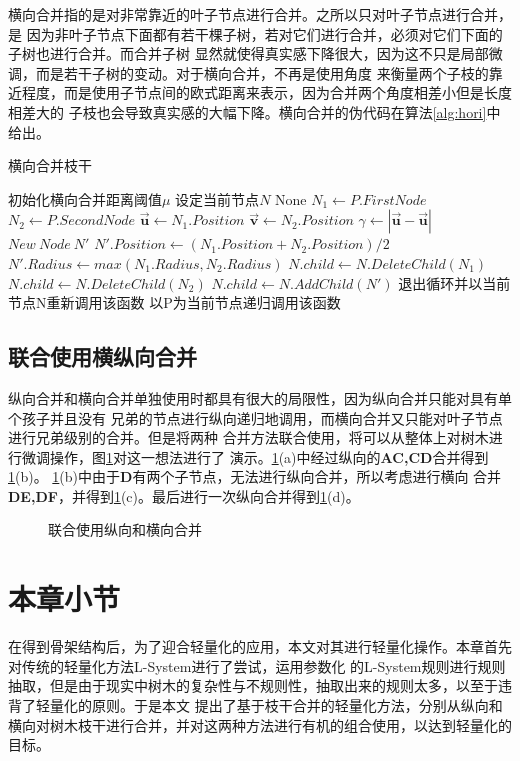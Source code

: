 横向合并指的是对非常靠近的叶子节点进行合并。之所以只对叶子节点进行合并，是
因为非叶子节点下面都有若干棵子树，若对它们进行合并，必须对它们下面的子树也进行合并。而合并子树
显然就使得真实感下降很大，因为这不只是局部微调，而是若干子树的变动。对于横向合并，不再是使用角度
来衡量两个子枝的靠近程度，而是使用子节点间的欧式距离来表示，因为合并两个角度相差小但是长度相差大的
子枝也会导致真实感的大幅下降。横向合并的伪代码在算法\ref{alg:hori}中
给出。

\begin{algorithm}[H]
	\caption{横向合并枝干}
	\label{alg:hori}
	\begin{algorithmic}[1] 
	\Require 初始化横向合并距离阈值$\mu$
	\Require 设定当前节点$N$
	\Ensure None
		\State $N_1 \gets P.FirstNode$
		\State $N_2 \gets P.SecondNode$
		\State $\mathbf{\vec{u}} \gets N_1.Position$
		\State $\mathbf{\vec{v}} \gets N_2.Position$
		\State $\gamma \gets |\mathbf{\vec{u}} - \mathbf{\vec{u}}|$
			\If{$\gamma<\mu$}
				\State $New\ Node\ N'$
				\State $N'.Position \gets (N_1.Position+N_2.Position)/2$
				\State $N'.Radius \gets max(N_1.Radius,N_2.Radius)$
				\State $N.child \gets N.DeleteChild(N_1)$
				\State $N.child \gets N.DeleteChild(N_2)$
				\State $N.child \gets N.AddChild(N')$
				\State 退出循环并以当前节点N重新调用该函数
			\EndIf
		\EndIf
	\EndFor
		\State 以P为当前节点递归调用该函数
	\EndFor
\end{algorithmic}
\end{algorithm}

\subsection{联合使用横纵向合并}

纵向合并和横向合并单独使用时都具有很大的局限性，因为纵向合并只能对具有单个孩子并且没有
兄弟的节点进行纵向递归地调用，而横向合并又只能对叶子节点进行兄弟级别的合并。但是将两种
合并方法联合使用，将可以从整体上对树木进行微调操作，图\ref{fig:combine}对这一想法进行了
演示。\ref{fig:combine}(a)中经过纵向的\textbf{AC,CD}合并得到\ref{fig:combine}(b)。
\ref{fig:combine}(b)中由于\textbf{D}有两个子节点，无法进行纵向合并，所以考虑进行横向
合并\textbf{DE,DF}，并得到\ref{fig:combine}(c)。最后进行一次纵向合并得到\ref{fig:combine}(d)。

\begin{figure}[H]
	\centering
	\hspace{6em}
	\hspace{6em}
	\hspace{6em}
	\caption{联合使用纵向和横向合并}
	\label{fig:combine}
\end{figure}

\section{本章小节}
在得到骨架结构后，为了迎合轻量化的应用，本文对其进行轻量化操作。本章首先对传统的轻量化方法L-System进行了尝试，运用参数化
的L-System规则进行规则抽取，但是由于现实中树木的复杂性与不规则性，抽取出来的规则太多，以至于违背了轻量化的原则。于是本文
提出了基于枝干合并的轻量化方法，分别从纵向和横向对树木枝干进行合并，并对这两种方法进行有机的组合使用，以达到轻量化的目标。
